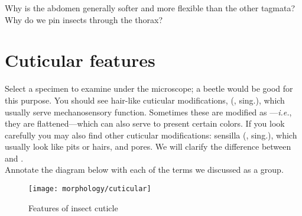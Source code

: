 \begin{theo} 
{}Why is the abdomen generally softer and more flexible than the other tagmata? Why do we pin insects through the thorax?\end{theo}

\section{Cuticular features}

\noindent{}Select a specimen to examine under the microscope; a beetle would be good for this purpose. You should see hair-like cuticular modifications,  (, sing.), which usually serve mechanosensory function. Sometimes these are modified as ---\textit{i.e.}, they are flattened---which can also serve to present certain colors. If you look carefully you may also find other cuticular modifications: sensilla (, sing.), which usually look like pits or hairs, and pores. We will clarify the difference between  and .\\

\noindent{}Annotate the diagram below with each of the terms we discussed as a group.

\begin{figure}[ht!]
  \centering
    \texttt{[image: morphology/cuticular]}
  \caption{Features of insect cuticle \citep[redrawn and modified from][Fig. 43, a figure after illustrations by Snodgrass and Comstock]{metcalf1939destructive}}
  \label{fig:cuticular}
\end{figure}
\clearpage
\thispagestyle{empty}
